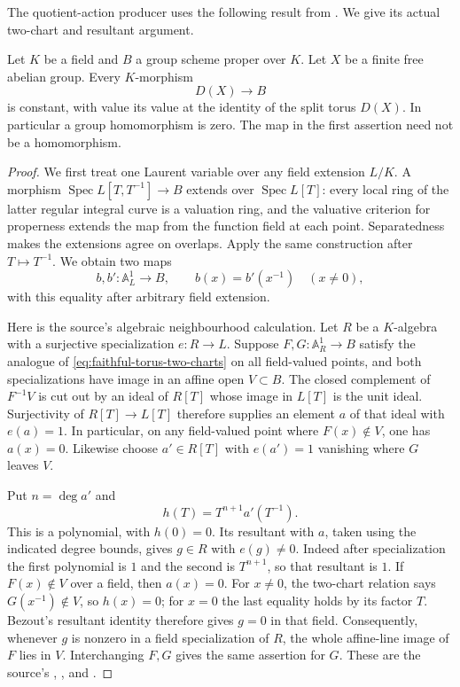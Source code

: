 The quotient-action producer uses the following result from
.  We give its actual
two-chart and resultant argument.

\begin{srlemma}\label{lem:faithful-torus-proper-constant}
Let \(K\) be a field and \(B\) a group scheme proper over \(K\).
Let \(X\) be a finite free abelian group.  Every \(K\)-morphism
\[
                         D(X)\longrightarrow B
\]
is constant, with value its value at the identity of the split
torus \(D(X)\).  In particular a group homomorphism is zero.
The map in the first assertion need not be a homomorphism.
\end{srlemma}
\begin{proof}
We first treat one Laurent variable over any field extension
\(L/K\).  A morphism
\(\operatorname{Spec}L[T,T^{-1}]\to B\) extends over
\(\operatorname{Spec}L[T]\): every local ring of the latter
regular integral curve is a valuation ring, and the valuative
criterion for properness extends the map from the function
field at each point.  Separatedness makes the extensions agree
on overlaps.  Apply the same construction after \(T\mapsto T^{-1}\).
We obtain two maps
\[
        b,b':\mathbb A^1_L\longrightarrow B,\qquad
                         b(x)=b'(x^{-1})\quad(x\ne0),
 \tag{TP1}\label{eq:faithful-torus-two-charts}
\]
with this equality after arbitrary field extension.

Here is the source's algebraic neighbourhood calculation.
Let \(R\) be a \(K\)-algebra with a surjective specialization
\(e:R\to L\).
Suppose \(F,G:\mathbb A^1_R\to B\) satisfy the analogue of
\eqref{eq:faithful-torus-two-charts} on all field-valued points,
and both specializations have image in an affine open
\(V\subset B\).
The closed complement of \(F^{-1}V\) is cut out by an ideal of
\(R[T]\) whose image in \(L[T]\) is the unit ideal.
Surjectivity of \(R[T]\to L[T]\) therefore supplies an element
\(a\) of that ideal with \(e(a)=1\).
In particular, on any field-valued point where \(F(x)\notin V\),
one has \(a(x)=0\).
Likewise choose \(a'\in R[T]\) with \(e(a')=1\) vanishing where
\(G\) leaves \(V\).

Put \(n=\deg a'\) and
\[
                  h(T)=T^{n+1}a'(T^{-1}).
\]
This is a polynomial, with \(h(0)=0\).
Its resultant with \(a\), taken using the indicated degree
bounds, gives \(g\in R\) with \(e(g)\ne0\).
Indeed after specialization the first polynomial is \(1\)
and the second is \(T^{n+1}\), so that resultant is \(1\).
If \(F(x)\notin V\) over a field, then \(a(x)=0\).
For \(x\ne0\), the two-chart relation says
\(G(x^{-1})\notin V\), so \(h(x)=0\); for \(x=0\) the last
equality holds by its factor \(T\).
Bezout's resultant identity therefore gives \(g=0\) in that
field.  Consequently, whenever \(g\) is nonzero in a field
specialization of \(R\), the whole affine-line image of \(F\)
lies in \(V\).  Interchanging \(F,G\) gives the same assertion
for \(G\).  These are the source's
, , and
.


\end{proof}
